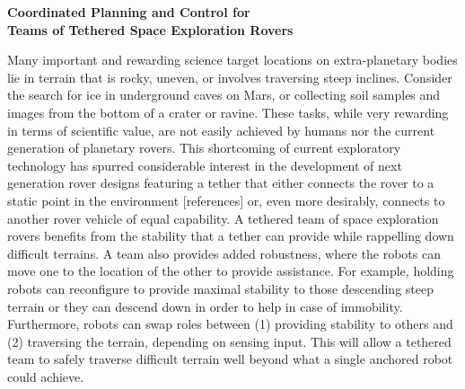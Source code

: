 \documentclass[12pt]{article}
\newcommand{\kostas}[1]{{\color{blue} #1}}
\begin{document}
\newpage

\begin{center}
{\bf Coordinated Planning and Control for\\ Teams of Tethered Space Exploration Rovers }

\end{center}
\vspace{-.1in}


 Many important and rewarding science
target locations on extra-planetary bodies lie in terrain that is
rocky, uneven, or involves traversing steep inclines. Consider the
search for ice in underground caves on Mars, or collecting soil
samples and images from the bottom of a crater or ravine.  These
tasks, while very rewarding in terms of scientific value, are not
easily achieved by humans nor the current generation of planetary
rovers. This shortcoming of current exploratory technology has spurred
considerable interest in the development of next generation rover
designs featuring a tether that either connects the rover to a static
point in the environment \kostas{[references]} or, even more
desirably, connects to another rover vehicle of equal capability. A
tethered team of space exploration rovers benefits from the stability
that a tether can provide while rappelling down difficult terrains.  A
team also provides added robustness, where the robots can move one to
the location of the other to provide assistance. For example, holding
robots can reconfigure to provide maximal stability to those
descending steep terrain or they can descend down in order to help in
case of immobility. Furthermore, robots can swap roles between (1)
providing stability to others and (2) traversing the terrain,
depending on sensing input. This will allow a tethered team to safely
traverse difficult terrain well beyond what a single anchored robot
could achieve.
\end{document}
